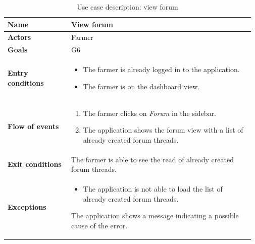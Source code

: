 \begin{table}[H]
    \centering
	\begin{tabular}{@{}p{0.25\linewidth} p{0.72\linewidth}@{}}
        \toprule
		\textbf{Name}               & View forum\\
		\midrule
		\textbf{Actors}             & Farmer\\
		\midrule
		\textbf{Goals}              & G6 \\
		\midrule
		
		\textbf{Entry conditions}   & \begin{itemize}[leftmargin=.4cm,noitemsep,topsep=0pt,before=\vspace{-3mm},after=\vspace{-4mm}]
		    \item The farmer is already logged in to the application.
		    \item The farmer is on the dashboard view.
		\end{itemize}\\
		\midrule
		
		\textbf{Flow of events}     & \begin{enumerate}[leftmargin=.4cm,noitemsep,topsep=0pt,before=\vspace{-3mm},after=\vspace{-4mm}]
		    \item The farmer clicks on \textit{Forum} in the sidebar.
		    \item The application shows the forum view with a list of already created forum threads.
		\end{enumerate}\\
		\midrule
		\textbf{Exit conditions}    & The farmer is able to see the read of already created forum threads. \\
		\midrule
		
		\textbf{Exceptions}         & 
	    \begin{itemize}[leftmargin=.4cm,noitemsep,topsep=0pt,before=\vspace{-3mm}]
		   \item The application is not able to load the list of already created forum threads.
		\end{itemize}
		The application shows a message indicating a possible cause of the error.
		\\\bottomrule
	\end{tabular}
	\caption{Use case description: view forum} 
\end{table}

